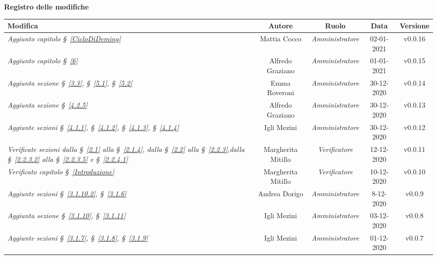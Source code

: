\quad
\begin{center}
	\LARGE\textbf{Registro delle modifiche}
\end{center}

\def\tabularxcolumn#1{m{#1}}
{

\begin{center}
		\renewcommand{\arraystretch}{1.4}
	\begin{tabularx}{\textwidth}{|X|c|c|c|c|}
		\hline
		\rowcolor{airforceblue}
		\textbf{Modifica} & \textbf{Autore} & \textbf{Ruolo} & \textbf{Data} & \textbf{Versione}	
		\\
		\hline
		\textit{Aggiunto capitolo \S~\ref{CicloDiDeming}} & Mattia Cocco & \textit{Amministratore} & 02-01-2021 & v0.0.16
		\\
		\hline
		\textit{Aggiunto capitolo \S~\ref{6}} & Alfredo Graziano & \textit{Amministratore} & 01-01-2021 & v0.0.15
		\\
		\hline
		\textit{Aggiunta sezione \S~\ref{3.3}, \S~\ref{5.1}, \S~\ref{5.2}} & Emma Roveroni & \textit{Amministratore} & 30-12-2020 & v0.0.14
		\\
		\hline
		\textit{Aggiunta sezione \S~\ref{4.2.5} } & Alfredo Graziano & \textit{Amministratore} & 30-12-2020 & v0.0.13
		\\
		\hline
		\textit{Aggiunte sezioni \S~\ref{4.1.1}, \S~\ref{4.1.2}, \S~\ref{4.1.3}, \S~\ref{4.1.4} } & Igli Mezini & \textit{Amministratore} & 30-12-2020 & v0.0.12
		\\
		\hline
		\textit{Verificate sezioni dalla \S~\ref{2.1} alla \S~\ref{2.1.4}, dalla \S~\ref{2.2} alla \S~\ref{2.2.3},dalla \S~\ref{2.2.3.2} alla \S~\ref{2.2.3.5} e \S~\ref{2.2.4.1}} & Margherita Mitillo & \textit{Verificatore} & 12-12-2020 & v0.0.11
		\\
		\hline
		\textit{Verificato capitolo \S~\ref{Introduzione}} & Margherita Mitillo & \textit{Verificatore} & 10-12-2020 & v0.0.10
		\\
		\hline
		\textit{Aggiunte sezioni \S~\ref{3.1.10.2}, \S~\ref{3.1.6}} & Andrea Dorigo & \textit{Amministratore} & 8-12-2020 & v0.0.9
		\\
		\hline
		\textit{Aggiunta sezione \S~\ref{3.1.10}, \S~\ref{3.1.11}} & Igli Mezini & \textit{Amministratore} & 03-12-2020 & v0.0.8
		\\
		\hline
		\textit{Aggiunte sezioni \S~\ref{3.1.7}, \S~\ref{3.1.8}, \S~\ref{3.1.9}} & Igli Mezini & \textit{Amministratore} & 01-12-2020 & v0.0.7
		\\
		\hline

\end{tabularx}
\end{center}}
